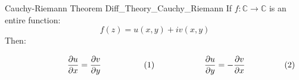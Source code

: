 \documentclass[crop=false,class=book,oneside]{standalone}
\begin{document}
            \begin{ftheorem}{Cauchy-Riemann Theorem}
                            {Diff_Theory_Cauchy_Riemann}
                If $f:\mathbb{C}\rightarrow\mathbb{C}$ is an
                entire function:
                \begin{equation}
                    f(z)=u(x,y)+iv(x,y)
                \end{equation}
                Then:
                \par
                \begin{subequations}
                    \begin{minipage}{0.49\textwidth}
                        \begin{equation}
                            \frac{\partial{u}}{\partial{x}}=
                            \frac{\partial{v}}{\partial{y}}
                        \end{equation}
                    \end{minipage}
                    \hfill
                    \begin{minipage}{0.49\textwidth}
                        \begin{equation}
                            \frac{\partial{u}}{\partial{y}}=
                            -\frac{\partial{v}}{\partial{x}}
                        \end{equation}
                    \end{minipage}
                \end{subequations}
                \par\hfill\par
            \end{ftheorem}
\end{document}

